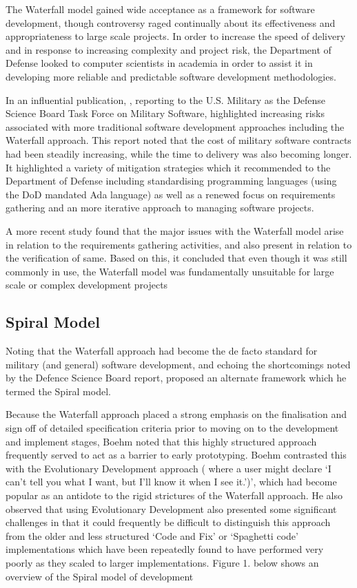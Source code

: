 \documentclass[a4paper,Times New Roman 11pt]{article}
\begin{document}
\begin{samepage}
\begin{samepage}
The Waterfall model gained wide acceptance as a framework for software development, though controversy raged continually about its effectiveness and appropriateness to large scale projects. In order to increase the speed of delivery and in response to increasing complexity and project risk, the Department of Defense looked to computer scientists in academia in order to assist it in developing more reliable and predictable software development methodologies. 

In an influential publication, \parencite{defensesscienceboard}, reporting to the U.S. Military as the Defense Science Board Task Force on Military Software, highlighted increasing risks associated with more traditional software development approaches including the Waterfall approach. This report noted that the cost of military software contracts had been steadily increasing, while the time to delivery was also becoming longer. It highlighted a variety of mitigation strategies which it recommended to the Department of Defense including standardising programming languages (using the DoD mandated Ada language) as well as a renewed focus on requirements gathering and an more iterative approach to managing software projects.

A more recent study \parencite{peterson} found that the major issues with the Waterfall model arise in relation to the requirements gathering activities, and also present in relation to the verification of same. Based on this, it concluded that even though it was still commonly in use, the Waterfall model was fundamentally unsuitable for large scale or complex development projects

\subsection {Spiral Model}
Noting that the Waterfall approach had become the de facto standard for military (and general) software development, and echoing the shortcomings noted by the Defence Science Board report, \parencite{boehm} proposed an alternate framework which he termed the Spiral model. 

Because the Waterfall approach placed a strong emphasis on the finalisation and sign off of detailed specification criteria prior to moving on to the development and implement stages, Boehm noted that this highly structured approach frequently served to act as a barrier to early prototyping. Boehm contrasted this with the Evolutionary Development approach ( where a user might declare `I can’t tell you what I want, but I’ll know it when I see it.')', which had become popular as an antidote to the rigid strictures of the Waterfall approach. He also observed that using  Evolutionary Development also presented some significant challenges in that it could frequently be difficult to distinguish this approach from the older and less structured `Code and Fix' or `Spaghetti code' implementations which have been repeatedly found to have performed very poorly as they scaled to larger implementations.
Figure 1. below shows an overview of the Spiral model of development


\end{samepage}
\end{samepage}
\end{document}
